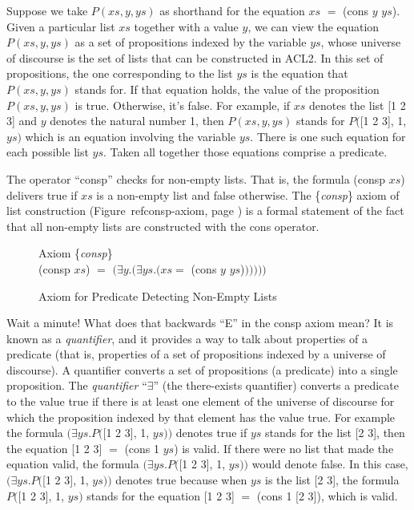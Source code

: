 Suppose we take $P(xs, y, ys)$ as shorthand
for the equation $xs$ $=$ (cons $y$ $ys$).
Given a particular list $xs$ together with a value $y$,
we can view the equation $P(xs, y, ys)$ as a set of propositions
indexed by the variable $ys$, whose universe of discourse is the set of
lists that can be constructed in ACL2.
In this set of propositions, the one corresponding to
the list $ys$ is the equation that $P(xs, y, ys)$ stands for.
If that equation holds, the value of the proposition $P(xs, y, ys)$ is true.
Otherwise, it's false.
For example, if $xs$ denotes the list [1 2 3]
and $y$ denotes the natural number 1,
then $P(xs, y, ys)$ stands for $P($[1 2 3], 1, $ys)$
which is an equation involving the variable $ys$.
There is one such equation for each possible list $ys$.
Taken all together those equations comprise a predicate.

The operator ``consp'' checks for non-empty lists.
That is, the formula (consp $xs$) delivers true
if $xs$ is a non-empty list and false otherwise.
The \{\emph{consp}\} axiom of list construction
(Figure~ref{consp-axiom}, page \pageref{consp-axiom})
is a formal statement of the fact that all non-empty lists
are constructed with the cons operator.

\begin{figure}
\begin{center}
Axiom \{\emph{consp}\} \\
(consp $xs$) $=$  $(\exists y.(\exists ys.(xs =$ (cons $y$ $ys$)$)))))$
\end{center}
\caption{Axiom for Predicate Detecting Non-Empty Lists}
\label{consp-axiom}
\end{figure}

Wait a minute! What does that backwards ``E'' in the consp axiom mean?
\label{quantifier-def}
It is known as a \emph{quantifier},
and it provides a way to talk about properties of a
predicate (that is, properties of a set of propositions indexed
by a universe of discourse).
A quantifier converts a set of propositions
(a predicate) into a single proposition.
The \emph{quantifier}
\label{exists-def}
``$\exists$'' (the there-exists quantifier)
converts a predicate to the value true if there
is at least one element of the universe of discourse
for which the proposition indexed by that element has the value true.
For example the formula
$(\exists ys.P($[1 2 3], 1, $ys))$ denotes true
if $ys$ stands for the list [2 3], then
the equation [1 2 3] $=$ (cons 1 $ys$) is valid.
If there were no list that made the equation valid,
the formula $(\exists ys.P($[1 2 3], 1, $ys))$
would denote false.
In this case, $(\exists ys.P($[1 2 3], 1, $ys))$ denotes true
because when $ys$ is the list [2 3], the
formula $P($[1 2 3], 1, $ys)$ stands for the equation
[1 2 3] $=$ (cons 1 [2 3]), which is valid.

